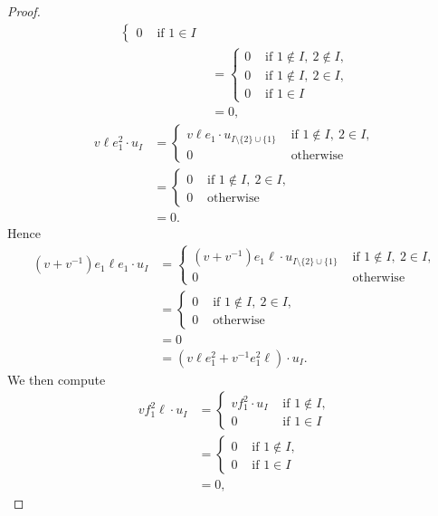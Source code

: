 \documentclass{amsart}
\numberwithin{equation}{section}
\theoremstyle{theorem}
\theoremstyle{definition}
\begin{document}
\begin{proof}
\begin{align*}
\begin{cases}
 0 & \text{ if }1\in I \end{cases} \\
 &=\begin{cases} 0 & \text{ if }1\not\in I,~2\not\in I, \\ 0 & \text{ if }1\not\in I,~2\in I,\\
 0 & \text{ if }1\in I \end{cases} \\
 &=0,\end{align*}
\begin{align*}v\ell e_1^2\cdot u_I&=\begin{cases}v\ell e_1\cdot u_{I\setminus\{2\}\cup\{1\}} & \text{ if }1\not\in I,~2\in I,\\
 0 & \text{ otherwise }\end{cases} \\
 &=\begin{cases}0 & \text{ if }1\not\in I,~2\in I,\\
 0 & \text{ otherwise }\end{cases} \\
&=0.\end{align*}
Hence
\begin{align*}(v+v^{-1})e_1\ell e_1\cdot u_I&=\begin{cases}(v+v^{-1})e_1\ell\cdot u_{I\setminus\{2\}\cup\{1\}} & \text{ if }1\not\in I,~2\in I,\\
 0 & \text{ otherwise }\end{cases} \\
  &=\begin{cases}0 & \text{ if }1\not\in I,~2\in I,\\
 0 & \text{ otherwise }\end{cases} \\
 &=0 \\
 &= (v\ell e_1^2+v^{-1}e_1^2\ell)\cdot u_I.\end{align*}
We then compute 
\begin{align*}vf_1^2\ell\cdot u_I&=\begin{cases}vf_1^2\cdot u_{I} & \text{ if }1\not\in I, \\
 0 & \text{ if }1\in I \end{cases} \\
 &=\begin{cases}0 & \text{ if }1\not\in I, \\
 0 & \text{ if }1\in I \end{cases} \\
 &=0,
\end{align*}

\end{proof}
\end{document}
